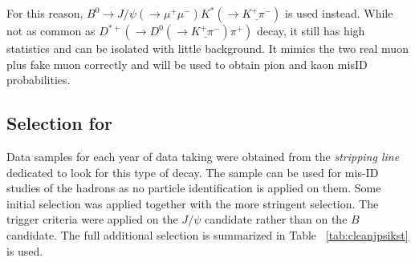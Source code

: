 
For this reason, $B^{0} \rightarrow J/\psi(\rightarrow \mu^{+} \mu^{-}) K^{*}(\rightarrow \underline{K^{+} \pi^{-}})$ is used instead. While not as common as $D^{*+}(\rightarrow D^{0}(\rightarrow \underline{K^{+} \pi^{-}}) \pi^{+})$ decay, it still has high statistics and can be isolated with little background. It mimics the two real muon plus fake muon correctly and will be used to obtain pion and kaon misID probabilities.

\subsection{Selection for   }
Data samples for each year of data taking were obtained from the \textit{stripping line} dedicated to look for this type of decay. The sample can be used for mis-ID studies of the hadrons as no particle identification is applied on them. Some initial selection was applied together with the more stringent \Bmumumu selection.  The trigger criteria were applied on the $J/\psi$ candidate rather than on the $B$ candidate. The full additional selection is summarized in Table ~\ref{tab:cleanjpsikst} is used.


